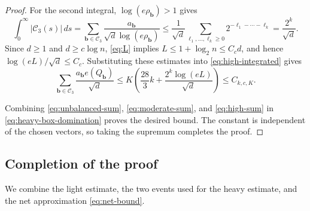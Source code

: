 \documentclass[10pt,a4paper]{amsart}
\numberwithin{equation}{section}
\begin{document}
\begin{proof}
For the second integral, $\log(e\rho_{\mathbf b})>1$ gives
\begin{equation}\label{eq:overhead-sum}
 \int_0^\infty|\mathcal C_3(s)|\,ds
 =\sum_{\mathbf b\in\mathcal C_3}
       \frac{a_{\mathbf b}}{\sqrt d\log(e\rho_{\mathbf b})}
 \le\frac1{\sqrt d}\sum_{\ell_1,\ldots,\ell_k\ge0}
       2^{-\ell_1-\cdots-\ell_k}
 =\frac{2^k}{\sqrt d}.
\end{equation}
Since $d\ge1$ and $d\ge c\log n$, \eqref{eq:L} implies
$L\le1+\log_2 n\le C_c d$, and hence
$\log(eL)/\sqrt d\le C_c$.
Substituting these estimates into \eqref{eq:high-integrated} gives
\begin{equation}\label{eq:high-sum}
 \sum_{\mathbf b\in\mathcal C_3}\frac{a_{\mathbf b}e(Q_{\mathbf b})}{\sqrt d}
 \le K\left(\frac{28}{3}k+
                 \frac{2^k\log(eL)}{\sqrt d}\right)
 \le C_{k,c,K}.
\end{equation}

Combining \eqref{eq:unbalanced-sum}, \eqref{eq:moderate-sum}, and
\eqref{eq:high-sum} in \eqref{eq:heavy-box-domination} proves the desired
bound. The constant is independent of the chosen vectors, so taking
the supremum completes the proof.
\end{proof}

\subsection{Completion of the proof}\label{sec:completion}

We combine the light estimate, the two events used for the heavy
estimate, and the net approximation \eqref{eq:net-bound}.
\end{document}
